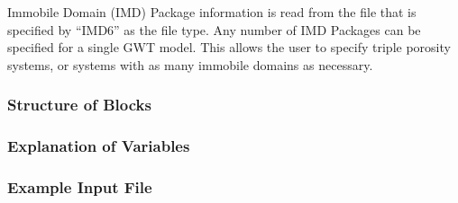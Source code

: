 Immobile Domain (IMD) Package information is read from the file that is specified by ``IMD6'' as the file type.  Any number of IMD Packages can be specified for a single GWT model.  This allows the user to specify triple porosity systems, or systems with as many immobile domains as necessary. 

\vspace{5mm}
\subsubsection{Structure of Blocks}



\vspace{5mm}
\subsubsection{Explanation of Variables}
\begin{description}

\end{description}

\vspace{5mm}
\subsubsection{Example Input File}


